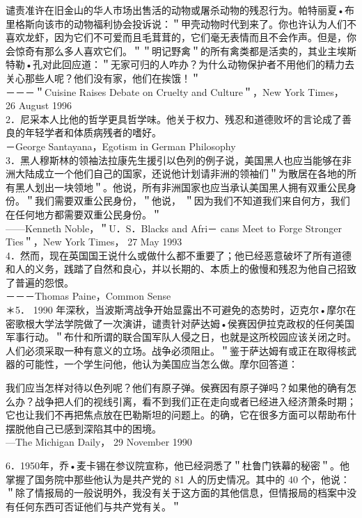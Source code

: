 谴责准许在旧金山的华人市场出售活的动物或屠杀动物的残忍行为。帕特丽夏•布里格斯向该市的动物福利协会投诉说：＂甲壳动物时代到来了。你也许认为人们不喜欢龙虾，因为它们不可爱而且毛茸茸的，它们毫无表情而且不会作声。但是，你会惊奇有那么多人喜欢它们。＂＂明记野禽＂的所有禽类都是活卖的，其业主埃斯特勒•孔对此回应道：＂无家可归的人咋办？为什么动物保护者不用他们的精力去关心那些人呢？他们没有家，他们在挨饿！＂\\
－－－＂Cuisine Raises Debate on Cruelty and Culture＂，New York Times， 26 August 1996\\
2．尼采本人比他的哲学更具哲学味。他关于权力、残忍和道德败坏的言论成了善良的年轻学者和体质病残者的嗜好。\\
－George Santayana，Egotism in German Philosophy\\
3．黑人穆斯林的领袖法拉康先生援引以色列的例子说，美国黑人也应当能够在非洲大陆成立一个他们自己的国家，还说他计划请非洲的领袖们＂为散居在各地的所有黑人划出一块领地＂。他说，所有非洲国家也应当承认美国黑人拥有双重公民身份。＂我们需要双重公民身份，＂他说， ＂因为我们不知道我们来自何方，我们在任何地方都需要双重公民身份。＂\\
——Kenneth Noble，＂U．S．Blacks and Afri－ cans Meet to Forge Stronger Ties＂，New York Times， 27 May 1993\\
4．然而，现在英国国王说什么或做什么都不重要了；他已经恶意破坏了所有道德和人的义务，践踏了自然和良心，并以长期的、本质上的傲慢和残忍为他自己招致了普遍的怨恨。\\
－－－Thomas Paine，Common Sense\\
＊5． 1990 年深秋，当波斯湾战争开始显露出不可避免的态势时，迈克尔•摩尔在密歌根大学法学院做了一次演讲，谴责针对萨达姆•侯赛因伊拉克政权的任何美国军事行动。＂布什和所谓的联合国军队人侵之日，也就是这所校园应该关闭之时。人们必须采取一种有意义的立场。战争必须阻止。＂鉴于萨达姆有或正在取得核武器的可能性，一个学生问他，他认为美国应当怎么做。摩尔回答道：

我们应当怎样对待以色列呢？他们有原子弹。侯赛因有原子弹吗？如果他的确有怎么办？战争把人们的视线引离，看不到我们正在走向或者已经进入经济萧条时期；它也让我们不再把焦点放在巴勒斯坦的问题上。的确，它在很多方面可以帮助布什摆脱他自己已感到深陷其中的困境。\\
—The Michigan Daily， 29 November 1990

6．1950年，乔•麦卡锡在参议院宣称，他已经洞悉了＂杜鲁门铁幕的秘密＂。他掌握了国务院中那些他认为是共产党的 81 人的历史情况。其中的 40 个，他说：＂除了情报局的一般说明外，我没有关于这方面的其他信息，但情报局的档案中没有任何东西可否证他们与共产党有关。＂

